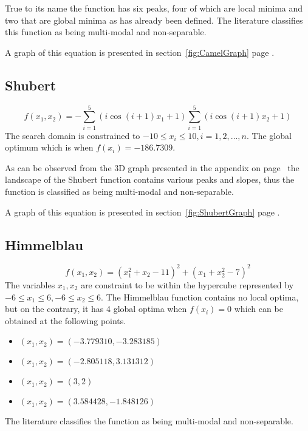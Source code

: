 True to its name the function has six peaks, four of which are local minima and two that are global minima as has already been defined. The literature classifies this function as being multi-modal and non-separable\cite{ABCCompareStudy,TestFunctions}.

A graph of this equation is presented in section~\ref{fig:CamelGraph} page \pageref{fig:CamelGraph}.
\subsection{Shubert}
\begin{equation}
	f(x_1,x_2) = -\sum_{i = 1}^5 (i\cos{(i +1)x_1 + 1})\sum_{i=1}^5 (i\cos{(i+1)x_2 + 1})
\end{equation}
The search domain is constrained to $-10 \leq x_i \leq 10, i = 1,2, \ldots, n$\cite{ABCCompareStudy,TSGlobalOptimization,ContinACSTS,TestFunctions}. The global optimum which is when $f(x_i) = -186.7309$\cite{ABCCompareStudy,TSGlobalOptimization,ContinACSTS,TestFunctions}. 

As can be observed from the 3D graph presented in the appendix on page~\pageref{fig:ShubertGraph} the landscape of the Shubert function contains various peaks and slopes, thus the function is classified as being multi-modal and non-separable\cite{ABCCompareStudy,TestFunctions}.

A graph of this equation is presented in section~\ref{fig:ShubertGraph} page \pageref{fig:ShubertGraph}.
\subsection{Himmelblau}
\begin{equation}
	f(x_1,x_2) = (x_1^2 + x_2 - 11)^2 + (x_1 + x_2^2 - 7)^2
\end{equation}
The variables $x_1,x_2$ are constraint to be within the hypercube represented by $-6 \leq x_1 \leq 6, -6 \leq x_2 \leq 6$\cite{TestFunctions,ABCCompareStudy}. The Himmelblau function contains no local optima, but on the contrary, it has 4 global optima when $f(x_i) = 0$ which can be obtained at the following points\cite{TestFunctions,ABCCompareStudy}.
\begin{itemize}
\item $(x_1,x_2) = (-3.779310,-3.283185)$
\item $(x_1,x_2) = (-2.805118,3.131312)$
\item $(x_1,x_2) = (3,2)$
\item $(x_1,x_2) = (3.584428,-1.848126)$
\end{itemize}
The literature classifies the function as being multi-modal and non-separable\cite{TestFunctions,ABCCompareStudy}.

